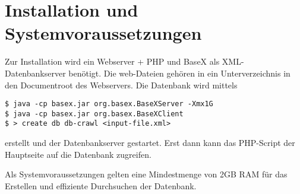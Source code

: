 \documentclass[10pt,a4paper]{scrartcl}
\begin{document}






\section{Installation und Systemvoraussetzungen}

Zur Installation wird ein Webserver + PHP und BaseX als XML-Datenbankserver benötigt. Die web-Dateien gehören in ein Unterverzeichnis in den Documentroot des Webservers. Die Datenbank wird mittels
\begin{verbatim}
$ java -cp basex.jar org.basex.BaseXServer -Xmx1G
$ java -cp basex.jar org.basex.BaseXClient
$ > create db db-crawl <input-file.xml>
\end{verbatim}

erstellt und der Datenbankserver gestartet. Erst dann kann das PHP-Script der Hauptseite auf die Datenbank zugreifen.

Als Systemvoraussetzungen gelten eine Mindestmenge von 2GB RAM für das Erstellen und effiziente Durchsuchen der Datenbank.
\end{document}
